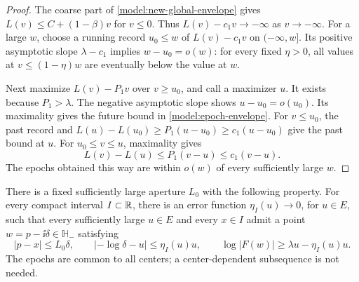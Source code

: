 \begin{proof}
The coarse part of \eqref{model:new-global-envelope} gives
\(L(v)\le C+(1-\beta)v\) for \(v\le0\).
Thus \(L(v)-c_1v\to-\infty\) as \(v\to-\infty\).
For a large \(w\), choose a running record \(u_0\le w\)
of \(L(v)-c_1v\) on \((-\infty,w]\).
Its positive asymptotic slope \(\lambda-c_1\) implies
\(w-u_0=o(w)\): for every fixed \(\eta>0\), all values
at \(v\le(1-\eta)w\) are eventually below the value at \(w\).

Next maximize \(L(v)-P_1v\) over \(v\ge u_0\), and call
a maximizer \(u\).  It exists because \(P_1>\lambda\).
The negative asymptotic slope shows \(u-u_0=o(u_0)\).
Its maximality gives the future bound in
\eqref{model:epoch-envelope}.
For \(v\le u_0\), the past record and
\(L(u)-L(u_0)\ge P_1(u-u_0)\ge c_1(u-u_0)\)
give the past bound at \(u\).  For \(u_0\le v\le u\),
maximality gives
\[
 L(v)-L(u)\le P_1(v-u)\le c_1(v-u).
\]
The epochs obtained this way are within \(o(w)\) of
every sufficiently large \(w\).
\end{proof}

\begin{proposition}
\label{prop:model-witnesses}
There is a fixed sufficiently large aperture \(L_0\) with
the following property.  For every compact interval
\(I\subset\mathbb R\), there is an error function
\(\eta_I(u)\to0\), for \(u\in E\), such that every
sufficiently large \(u\in E\) and every \(x\in I\) admit
a point \(w=p-\ii\delta\in\mathbb H_-\) satisfying
\begin{equation}
\label{model:witness-estimate}
 |p-x|\le L_0\delta,\qquad
 |-\log\delta-u|\le\eta_I(u)u,\qquad
 \log|F(w)|\ge\lambda u-\eta_I(u)u.
\end{equation}
The epochs are common to all centers; a center-dependent
subsequence is not needed.
\end{proposition}

